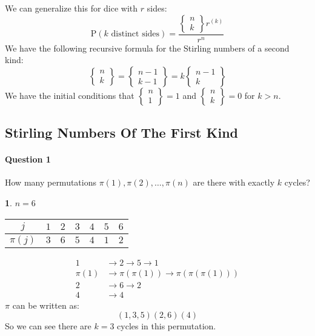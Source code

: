 \documentclass[english,12pt]{article}
\theoremstyle{plain}
\theoremstyle{definition}
\newtheorem*{example}{\protect\examplename}
\theoremstyle{definition} %
\newcommand{\eg}[1]{\begin{example} #1 \end{example} }
\providecommand{\examplename}{Example}
\begin{document}
We can generalize this for dice with $r$ sides:
\[\text{P}(k\text{ distinct sides})=\frac{\begin{Bmatrix}n\\ k\end{Bmatrix}r^{(k)}}{r^n}\]
We have the following recursive formula for the Stirling numbers of a second kind:
\[\begin{Bmatrix}
n\\
k
\end{Bmatrix}=
\begin{Bmatrix}
n-1\\
k-1
\end{Bmatrix}
=k\begin{Bmatrix}
n-1\\
k
\end{Bmatrix}\]
We have the initial conditions that $\begin{Bmatrix}
n\\
1
\end{Bmatrix}
=1$ and $\begin{Bmatrix}
n\\
k
\end{Bmatrix}
=0$
 for $k>n$.

\subsection{Stirling Numbers Of The First Kind}
\paragraph{Question 1} How many permutations $\pi(1),\pi(2),\ldots,\pi(n)$ are there with exactly $k$ cycles?

\eg{
$n=6$
\begin{tabular}{|c|c|c|c|c|c|c|}
\hline
$j$ & $1$ & $2$ & $3$ & $4$ & $5$ & $6$\\
\hline
$\pi(j)$ & $3$ & $6$ & $5$ & $4$ & $1$ & $2$\\
\hline
\end{tabular}

\begin{align*}
1&\rightarrow 2\rightarrow 5\rightarrow 1\\
\pi(1)&\rightarrow\pi(\pi(1))\rightarrow\pi(\pi(\pi(1)))\\
2&\rightarrow 6\rightarrow 2\\
4&\rightarrow 4
\end{align*}
$\pi$ can be written as:
\[(1,3,5)(2,6)(4)\]
So we can see there are $k=3$ cycles in this permutation.
}
\end{document}
